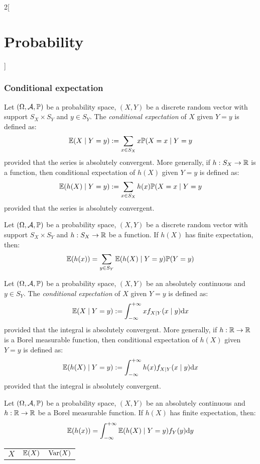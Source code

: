 \documentclass[../../../main.tex]{subfiles}
\begin{document}
\begin{multicols}{2}[\section{Probability}]
  \subsubsection{Conditional expectation}
  \begin{definition}
    Let $(\Omega,\mathcal{A},\mathbb{P})$ be a probability space, $(X,Y)$ be a discrete random vector with support $S_X\times S_Y$ and $y\in S_Y$. The \textit{conditional expectation} of $X$ given $Y=y$ is defined as: $$\mathbb{E}(X\mid Y=y):=\sum_{x\in S_X}x\mathbb{P}(X=x\mid Y=y$$ provided that the series is absolutely convergent. More generally, if $h:S_X\rightarrow\mathbb{R}$ is a function, then conditional expectation of $h(X)$ given $Y=y$ is defined as: $$\mathbb{E}(h(X)\mid Y=y):=\sum_{x\in S_X}h(x)\mathbb{P}(X=x\mid Y=y$$ provided that the series is absolutely convergent.
  \end{definition}
  \begin{prop}
    Let $(\Omega,\mathcal{A},\mathbb{P})$ be a probability space, $(X,Y)$ be a discrete random vector with support $S_X\times S_Y$ and $h:S_X\rightarrow\mathbb{R}$ be a function. If $h(X)$ has finite expectation, then: $$\mathbb{E}(h(x))=\sum_{y\in S_Y}\mathbb{E}(h(X)\mid Y=y)\mathbb{P}(Y=y)$$
  \end{prop}
  \begin{definition}
    Let $(\Omega,\mathcal{A},\mathbb{P})$ be a probability space, $(X,Y)$ be an absolutely continuous and $y\in S_Y$. The \textit{conditional expectation} of $X$ given $Y=y$ is defined as: $$\mathbb{E}(X\mid Y=y):=\int_{-\infty}^{+\infty}xf_{X\mid Y}(x\mid y)\dd x$$ provided that the integral is absolutely convergent. More generally, if $h:\mathbb{R}\rightarrow\mathbb{R}$ is a Borel measurable function, then conditional expectation of $h(X)$ given $Y=y$ is defined as: $$\mathbb{E}(h(X)\mid Y=y):=\int_{-\infty}^{+\infty}h(x)f_{X\mid Y}(x\mid y)\dd x$$ provided that the integral is absolutely convergent.
  \end{definition}
  \begin{prop}
    Let $(\Omega,\mathcal{A},\mathbb{P})$ be a probability space, $(X,Y)$ be an absolutely continuous and $h:\mathbb{R}\rightarrow\mathbb{R}$ be a Borel measurable function. If $h(X)$ has finite expectation, then: $$\mathbb{E}(h(x))=\int_{-\infty}^{+\infty}\mathbb{E}(h(X)\mid Y=y)f_Y(y)\dd y$$
  \end{prop}
  \begin{center}
    \def\arraystretch{1.25}
    \begin{tabular}{|c|c|c|}
      \hline
      $X$                      & $\displaystyle \mathbb{E}(X)$        & $\displaystyle \operatorname{Var}(X)$                     \\

\end{tabular}
\end{center}
\end{multicols}
\end{document}
